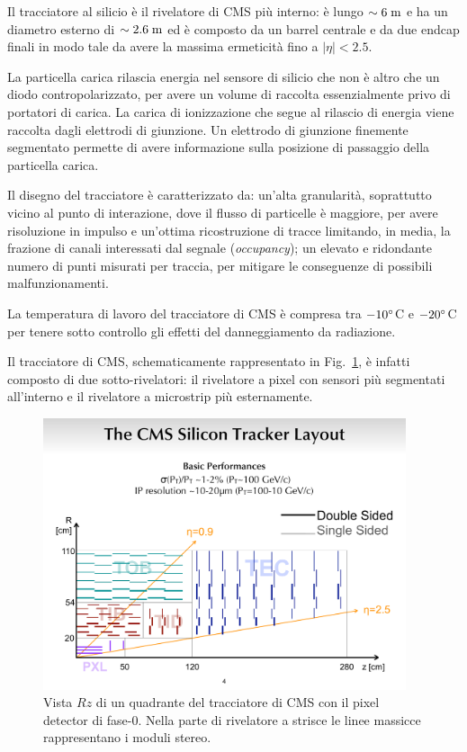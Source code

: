 Il tracciatore al silicio \`e il rivelatore di CMS pi\`u interno: \`e lungo $\sim6\rm \; m$ e ha un diametro esterno di $\sim 2.6\rm \; m$ ed \`e composto da un barrel centrale e da due endcap finali in modo tale da avere la massima ermeticit\`a fino a $|\eta|<2.5$.

La particella carica rilascia energia nel sensore di silicio che non \`e altro che un diodo contropolarizzato, per avere un volume di raccolta essenzialmente privo di portatori di carica. La carica di ionizzazione che segue al rilascio di energia viene raccolta dagli elettrodi di giunzione. Un elettrodo di giunzione finemente segmentato permette di avere informazione sulla posizione di passaggio della particella carica.

Il disegno del tracciatore \`e caratterizzato da: un’alta granularit\`a, soprattutto vicino al punto di interazione, dove il flusso di particelle \`e maggiore, per avere risoluzione in impulso e un'ottima ricostruzione di tracce limitando, in media, la frazione di canali interessati dal segnale ({\em occupancy}); un elevato e ridondante numero di punti misurati per traccia, per mitigare le conseguenze di possibili malfunzionamenti.

La temperatura di lavoro del tracciatore di CMS \`e compresa tra $-10^\circ$C e $-20^\circ$C per tenere sotto controllo gli effetti del danneggiamento da radiazione.
  
Il tracciatore di CMS, schematicamente rappresentato in Fig.~\ref{fig:CMSTk}, \`e infatti composto di due sotto-rivelatori: il rivelatore a pixel con sensori pi\`u segmentati all'interno e il rivelatore a microstrip pi\`u esternamente. 
  
\begin{figure}
\centering
\includegraphics[width=0.95\textwidth]{Immagini/layout_rz.pdf}
\caption{Vista $Rz$ di un quadrante del tracciatore di CMS con il pixel detector di fase-0. Nella parte di rivelatore a strisce le linee massicce rappresentano i moduli stereo.}
\label{fig:CMSTk}
\end{figure}

